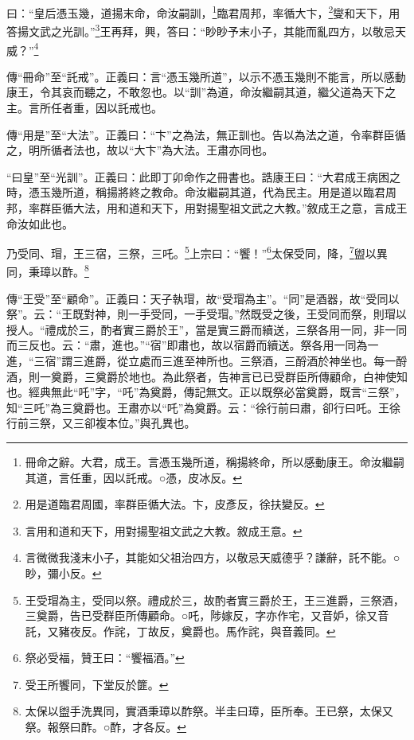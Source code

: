 曰：“皇后憑玉幾，道揚末命，命汝嗣訓，\footnote{冊命之辭。大君，成王。言憑玉幾所道，稱揚終命，所以感動康王。命汝繼嗣其道，言任重，因以託戒。○憑，皮冰反。}臨君周邦，率循大卞，\footnote{用是道臨君周國，率群臣循大法。卞，皮彥反，徐扶變反。}燮和天下，用答揚文武之光訓。”\footnote{言用和道和天下，用對揚聖祖文武之大教。敘成王意。}王再拜，興，答曰：“眇眇予末小子，其能而亂四方，以敬忌天威？”\footnote{言微微我淺末小子，其能如父祖治四方，以敬忌天威德乎？謙辭，託不能。○眇，彌小反。}


{\noindent\zhuan{}\fzbyks 傳“冊命”至“託戒”。正義曰：言“憑玉幾所道”，以示不憑玉幾則不能言，所以感動康王，令其哀而聽之，不敢忽也。以“訓”為道，命汝繼嗣其道，繼父道為天下之主。言所任者重，因以託戒也。 \par}

{\noindent\zhuan{}\fzbyks 傳“用是”至“大法”。正義曰：“卞”之為法，無正訓也。告以為法之道，令率群臣循之，明所循者法也，故以“大卞”為大法。王肅亦同也。 \par}

{\noindent\shu{}\fzkt “曰皇”至“光訓”。正義曰：此即丁卯命作之冊書也。誥康王曰：“大君成王病困之時，憑玉幾所道，稱揚將終之教命。命汝繼嗣其道，代為民主。用是道以臨君周邦，率群臣循大法，用和道和天下，用對揚聖祖文武之大教。”敘成王之意，言成王命汝如此也。 \par}

乃受同、瑁，王三宿，三祭，三吒。\footnote{王受瑁為主，受同以祭。禮成於三，故酌者實三爵於王，王三進爵，三祭酒，三奠爵，告已受群臣所傳顧命。○吒，陟嫁反，字亦作宅，又音妒，徐又音託，又豬夜反。作詫，丁故反，奠爵也。馬作詫，與音義同。}上宗曰：“饗！”\footnote{祭必受福，贊王曰：“饗福酒。”}太保受同，降，\footnote{受王所饗同，下堂反於篚。}盥以異同，秉璋以酢。\footnote{太保以盥手洗異同，實酒秉璋以酢祭。半圭曰璋，臣所奉。王已祭，太保又祭。報祭曰酢。○酢，才各反。}


{\noindent\zhuan{}\fzbyks 傳“王受”至“顧命”。正義曰：天子執瑁，故“受瑁為主”。“同”是酒器，故“受同以祭”。云：“王既對神，則一手受同，一手受瑁。”然既受之後，王受同而祭，則瑁以授人。“禮成於三，酌者實三爵於王”，當是實三爵而續送，三祭各用一同，非一同而三反也。云：“肅，進也。”“宿”即肅也，故以宿爵而續送。祭各用一同為一進，“三宿”謂三進爵，從立處而三進至神所也。三祭酒，三酹酒於神坐也。每一酹酒，則一奠爵，三奠爵於地也。為此祭者，告神言已已受群臣所傳顧命，白神使知也。經典無此“吒”字，“吒”為奠爵，傳記無文。正以既祭必當奠爵，既言“三祭”，知“三吒”為三奠爵也。王肅亦以“吒”為奠爵。云：“徐行前曰肅，卻行曰吒。王徐行前三祭，又三卻複本位。”與孔異也。 \par}

